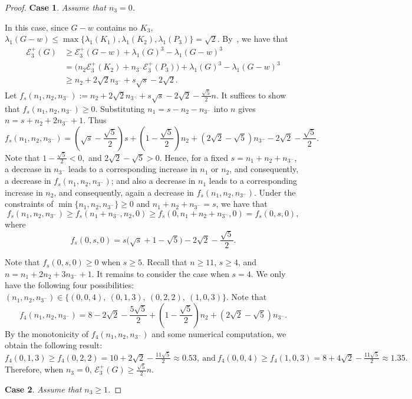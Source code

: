 \documentclass[a4paper,12pt]{article}
\theoremstyle{plain}
\begin{document}
\begin{proof}
\medskip
\noindent
{\bf Case 1}. \emph{Assume that $n_3=0$.} 
\medskip

In this case, since $G-w$ contains no $K_3$, $\lambda_1(G-w)\leq \max\{\lambda_1(K_1),\lambda_1(K_2),\lambda_1(P_3)\}=\sqrt{2}$. 
By~, we have that
\[
\begin{aligned}
\mathcal{E}^+_3(G) 
&\geq \mathcal{E}^+_3(G-w)+\lambda_1(G)^3-\lambda_1(G-w)^3\\
&=\big(n_2\mathcal{E}^+_3(K_2)+n_{3^-}\mathcal{E}^+_3(P_3))+\lambda_1(G)^3-\lambda_1(G-w)^3\\
&\geq n_2+2\sqrt{2}n_{3^-}+s\sqrt{s}-2\sqrt{2}.
\end{aligned}
\]
Let $f_s(n_1,n_2,n_{3^-}):=n_2+2\sqrt{2}n_{3^-}+s\sqrt{s}-2\sqrt{2}- \frac{\sqrt{5}}{2}n$. It suffices to show that $f_s(n_1,n_2,n_{3^-})\geq 0$.
Substituting $n_1 = s - n_2 - n_{3^-}$ into $n$ gives
$n = s + n_2 + 2 n_{3^-} + 1.$ Thus $$f_s(n_1,n_2,n_{3^-})=(\sqrt{s}- \frac{\sqrt{5}}{2})s+(1-\frac{\sqrt{5}}{2})n_2+(2\sqrt{2}-\sqrt{5})n_{3^-}-2\sqrt{2}- \frac{\sqrt{5}}{2}.$$ Note that $1 - \frac{\sqrt{5}}{2} < 0,$ and $2\sqrt{2} -\sqrt{5} > 0.$ Hence, for a fixed $s = n_1 + n_2 + n_{3^-}$, a decrease in $n_{3^-}$ leads to a corresponding increase in $n_1$ or $n_2$, and consequently, a decrease in $f_s(n_1, n_2, n_{3^-})$; and also a decrease in $n_1$ leads to a corresponding increase in $n_2$, and consequently, again a decrease in $f_s(n_1, n_2, n_{3^-})$.  
Under the constraints of
$\min\{n_1, n_2, n_{3^-}\}\geq 0$ and $n_1 + n_2 + n_{3^-} = s$, we have that $$f_s(n_1, n_2, n_{3^-})\geq f_s(n_1+n_{3^-}, n_2,0 )\geq f_s(0, n_1+n_2+n_{3^-},0)=f_s(0,s,0),$$
where
$$
f_s(0,s,0)=s\bigl(\sqrt{s} + 1 - \sqrt{5}\bigr) - 2\sqrt{2} - \frac{\sqrt{5}}{2}.
$$

Note that $f_s(0,s,0)\geq 0$ when $s\geq 5$. Recall that $n\geq 11$, $s\geq 4$, and $n=n_1+2n_2+3n_{3^-}+1$. It remains to consider the case when $s=4$. We only have the following four possibilities: $(n_1,n_2,n_{3^-})\in \{(0,0,4),~(0,1,3),~(0,2,2),~(1,0,3)\}$. Note that $$f_4(n_1,n_2,n_{3^-})=8-2\sqrt{2}-\frac{5\sqrt{5}}{2}+(1-\frac{\sqrt{5}}{2})n_2+(2\sqrt{2}-\sqrt{5})n_{3^-}.$$ By the monotonicity of $f_4(n_1,n_2,n_{3^-})$ and some numerical computation, we obtain the following result: $f_4(0,1,3)\geq f_4(0,2,2)= 10 + 2\sqrt{2} - \frac{11\sqrt{5}}{2} \approx 0.53,~\text{and} ~f_4(0,0,4)\geq f_4(1,0,3) = 8 + 4\sqrt{2} - \frac{11\sqrt{5}}{2} \approx 1.35.$ Therefore, when $n_3=0$, $\mathcal{E}^+_3(G) \geq \frac{\sqrt{5}}{2}n.$


\medskip
\noindent
{\bf Case 2}. \emph{Assume that $n_3\geq 1$.}
\medskip


\end{proof}
\end{document}
